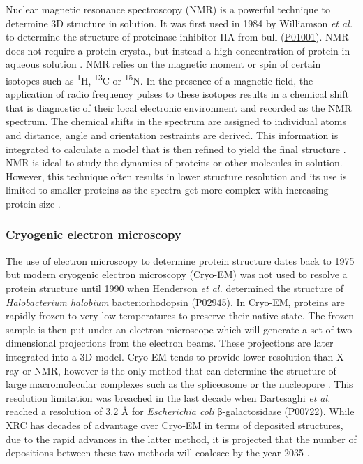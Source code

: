 Nuclear magnetic resonance spectroscopy (NMR) is a powerful technique to determine 3D structure in solution. It was first used in 1984 by Williamson \textit{et al.} \cite{WILLIAMSON_1985_NMR} to determine the structure of proteinase inhibitor IIA from bull (\href{https://www.uniprot.org/uniprotkb/P01001/entry}{P01001}). NMR does not require a protein crystal, but instead a high concentration of protein in aqueous solution \cite{WUTHRICH_1982_NMR}. NMR relies on the magnetic moment or spin of certain isotopes such as \textsuperscript{1}H, \textsuperscript{13}C or \textsuperscript{15}N. In the presence of a magnetic field, the application of radio frequency pulses to these isotopes results in a chemical shift that is diagnostic of their local electronic environment and recorded as the NMR spectrum. The chemical shifts in the spectrum are assigned to individual atoms and distance, angle and orientation restraints are derived. This information is integrated to calculate a model that is then refined to yield the final structure \cite{WUTHRICH_1984_NMR}. NMR is ideal to study the dynamics of proteins or other molecules in solution. However, this technique often results in lower structure resolution and its use is limited to smaller proteins as the spectra get more complex with increasing protein size \cite{EMWAS_2015_NMR}.

\subsubsection{Cryogenic electron microscopy}

The use of electron microscopy to determine protein structure dates back to 1975 \cite{HENDERSON_1975_EM} but modern cryogenic electron microscopy (Cryo-EM) was not used to resolve a protein structure until 1990 when Henderson \textit{et al.} \cite{HENDERSON_1990_CRYOEM} determined the structure of \textit{Halobacterium halobium} bacteriorhodopsin (\href{https://www.uniprot.org/uniprotkb/P02945/entry}{P02945}). In Cryo-EM, proteins are rapidly frozen to very low temperatures to preserve their native state. The frozen sample is then put under an electron microscope which will generate a set of two-dimensional projections from the electron beams. These projections are later integrated into a 3D model. Cryo-EM tends to provide lower resolution than X-ray or NMR, however is the only method that can determine the structure of large macromolecular complexes such as the spliceosome \cite{CHUANGYE_2016_SPLICEOSOME} or the nucleopore \cite{KOSINSKI_2016_NUCLEOPORE}. This resolution limitation was breached in the last decade when Bartesaghi \textit{et al.} \cite{BARTESAGHI_2014_CRYOEM} reached a resolution of 3.2 \AA{} for \textit{Escherichia coli} β-galactosidase (\href{https://www.uniprot.org/uniprotkb/P00722/entry}{P00722}). While XRC has decades of advantage over Cryo-EM in terms of deposited structures, due to the rapid advances in the latter method, it is projected that the number of depositions between these two methods will coalesce by the year 2035 \cite{CHIU_2021_CRYOEM}.


